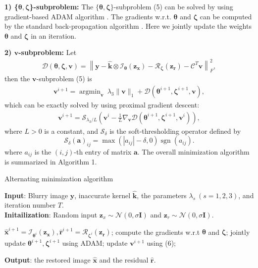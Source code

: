 \documentclass[10pt,twocolumn,letterpaper]{article}
\begin{document}
	\textbf{1) \{$\bm\theta,\bm\zeta$\}-subproblem:} The $\{\bm\theta,\bm\zeta\}$-subproblem (5) can be solved by using gradient-based ADAM algorithm \cite{Adam}. The gradients w.r.t. $\bm \theta$ and $\bm \zeta$ can be computed by the standard back-propagation algorithm \cite{BP}.  Here we jointly update the weights $\bm\theta$ and $\bm \zeta$  in an iteration. 
	
	\textbf{2) $\bm v$-subproblem:}	
	Let 
	\begin{align}
		\mathcal D(\bm\theta,\bm\zeta,\bm v)=\left\|\bm y-\boldsymbol{\widehat k}\otimes\mathcal I_{\bm\theta}(\bm{z_x})-\mathcal R_{\bm\zeta}(\bm{z_r})-\mathcal C^T\bm v\right\|_F^2, \nonumber
	\end{align}
	then the $\bm v$-subproblem (5) is 
	\begin{align}
		\bm v^{i+1}=\mathop{\arg\min}_{\bm v} ~\lambda_3\|\bm v\|_1+\mathcal D(\bm\theta^{i+1},\bm\zeta^{i+1},\bm v)\nonumber,
	\end{align}
	which can be exactly solved by using proximal gradient descent: 
	\begin{align}
		\bm v^{i+1}=\mathcal S_{\lambda_3/L}\left(\bm v^i-\frac{1}{L}\nabla_{\bm v}\mathcal D(\bm\theta^{i+1},\bm\zeta^{i+1},\bm v^i)\right),
	\end{align} %
	where $L>0$ is a constant, and {$\mathcal S_\delta$} is the soft-thresholding operator defined by
	$$\mathcal{S}_{\delta}(\bm a)_{ij}=\max\left(\left|a_{ij}\right|-\delta, 0\right)\operatorname{sgn}\left(a_{ij}\right).$$
	where $a_{ij}$ is the $(i,j)$-th entry of matrix $\bm a$. The overall minimization algorithm is summarized in Algorithm 1.
	
	
	\begin{minipage}{8cm}
		\begin{algorithm}[H]
			\caption{Alternating minimization algorithm}  
			\textbf{Input}:  Blurry image $\bm y$,  inaccurate kernel $\bm{\widehat k}$, the parameters ${\lambda_s~(s=1,2,3)}$, and iteration number $T$.  \\
			\textbf{Initailization}: Random input $\bm z_x\sim \mathcal N(0,\sigma\bm I)$ and $\bm z_r\sim \mathcal N(0,\sigma\bm I)$.
			
			\begin{algorithmic}[1]
				\STATE $\widehat{\bm{x}}^{i+1}=\mathcal I_{\bm\theta^{i}}(\bm{z_x}), 
				\widehat{\bm{r}}^{i+1}=\mathcal R_{\bm\zeta^{i}}(\bm{z_r})$;
				\STATE compute the gradients w.r.t $\bm\theta$ and $\bm\zeta$;
				\STATE jointly update $\bm\theta^{i+1}, \bm\zeta^{i+1}$ using ADAM;
				\STATE update $\bm v^{i+1}$ using (6);			
				\ENDFOR
			\end{algorithmic} 
			\textbf{Output}: the restored image $\widehat{\bm{x}}$ and the residual $\widehat{\bm{r}}.$
		\end{algorithm} 
	\end{minipage}
	
\end{document}

